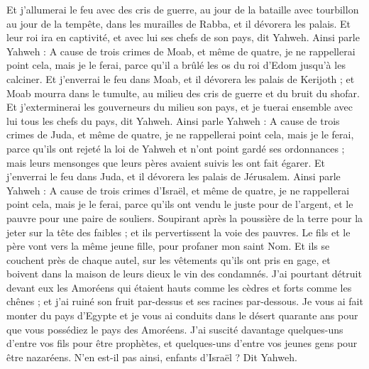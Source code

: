 \begin{multicols}{2}
Et j'allumerai le feu avec des cris de guerre, au jour de la bataille avec tourbillon au jour de la tempête, dans les murailles de Rabba, et il dévorera les palais. 
Et leur roi ira en captivité, et avec lui ses chefs de son pays, dit Yahweh.
\VerseOne{}Ainsi parle Yahweh : A cause de trois crimes de Moab, et même de quatre, je ne rappellerai point cela, mais je le ferai, parce qu'il a brûlé les os du roi d'Edom jusqu'à les calciner.
Et j'enverrai le feu dans Moab, et il dévorera les palais de Kerijoth ; et Moab mourra dans le tumulte, au milieu des cris de guerre et du bruit du shofar.
Et j'exterminerai les gouverneurs du milieu son pays, et je tuerai ensemble avec lui tous les chefs du pays, dit Yahweh.
Ainsi parle Yahweh : A cause de trois crimes de Juda, et même de quatre, je ne rappellerai point cela, mais je le ferai, parce qu'ils ont rejeté la loi de Yahweh et n'ont point gardé ses ordonnances ; mais leurs mensonges que leurs pères avaient suivis les ont fait égarer. 
Et j'enverrai le feu dans Juda, et il dévorera les palais de Jérusalem.
Ainsi parle Yahweh : A cause de trois crimes d'Israël, et même de quatre, je ne rappellerai point cela, mais je le ferai, parce qu'ils ont vendu le juste pour de l'argent, et le pauvre pour une paire de souliers.
Soupirant après la poussière de la terre pour la jeter sur la tête des faibles ; et ils pervertissent la voie des pauvres. Le fils et le père vont vers la même jeune fille, pour profaner mon saint Nom.
Et ils se couchent près de chaque autel, sur les vêtements qu'ils ont pris en gage, et boivent dans la maison de leurs dieux le vin des condamnés.
J'ai pourtant détruit devant eux les Amoréens qui étaient hauts comme les cèdres et forts comme les chênes ; et j'ai ruiné  son fruit par-dessus et ses racines par-dessous.
Je vous ai fait monter du pays d'Egypte et je vous ai conduits dans le désert quarante ans pour que vous possédiez le pays des Amoréens.
J'ai suscité davantage quelques-uns d'entre vos fils pour être prophètes, et quelques-uns d'entre vos jeunes gens pour être nazaréens. N'en est-il pas ainsi, enfants d'Israël ? Dit Yahweh.

\end{multicols}
